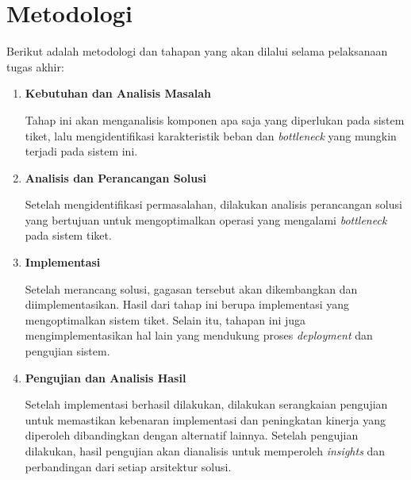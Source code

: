 \section{Metodologi}

Berikut adalah metodologi dan tahapan yang akan dilalui selama pelaksanaan tugas akhir:

\begin{enumerate}
      \item \textbf{Kebutuhan dan Analisis Masalah}

            Tahap ini akan menganalisis komponen apa saja yang diperlukan pada sistem tiket, lalu mengidentifikasi karakteristik beban dan \textit{bottleneck} yang mungkin terjadi pada sistem ini.

      \item \textbf{Analisis dan Perancangan Solusi}

            Setelah mengidentifikasi permasalahan, dilakukan analisis perancangan solusi yang bertujuan untuk mengoptimalkan operasi yang mengalami \textit{bottleneck} pada sistem tiket.

      \item \textbf{Implementasi}

            Setelah merancang solusi, gagasan tersebut akan dikembangkan dan diimplementasikan. Hasil dari tahap ini berupa implementasi yang mengoptimalkan sistem tiket. Selain itu, tahapan ini juga mengimplementasikan hal lain yang mendukung proses \textit{deployment} dan pengujian sistem.

      \item \textbf{Pengujian dan Analisis Hasil}

            Setelah implementasi berhasil dilakukan, dilakukan serangkaian pengujian untuk memastikan kebenaran implementasi dan peningkatan kinerja yang diperoleh dibandingkan dengan alternatif lainnya. Setelah pengujian dilakukan, hasil pengujian akan dianalisis untuk memperoleh \textit{insights} dan perbandingan dari setiap arsitektur solusi.

\end{enumerate}